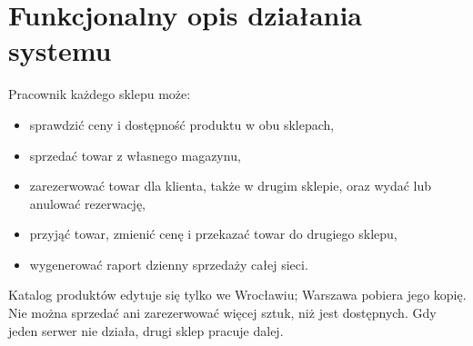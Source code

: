 \documentclass[11pt,a4paper]{article}
\begin{document}
\section{Funkcjonalny opis działania systemu}
Pracownik każdego sklepu może:
\begin{itemize}
  \item sprawdzić ceny i dostępność produktu w obu sklepach,
  \item sprzedać towar z własnego magazynu,
  \item zarezerwować towar dla klienta, także w drugim sklepie, oraz wydać lub anulować rezerwację,
  \item przyjąć towar, zmienić cenę i przekazać towar do drugiego sklepu,
  \item wygenerować raport dzienny sprzedaży całej sieci.
\end{itemize}
Katalog produktów edytuje się tylko we Wrocławiu; Warszawa pobiera jego kopię.
Nie można sprzedać ani zarezerwować więcej sztuk, niż jest dostępnych.
Gdy jeden serwer nie działa, drugi sklep pracuje dalej.

\end{document}
